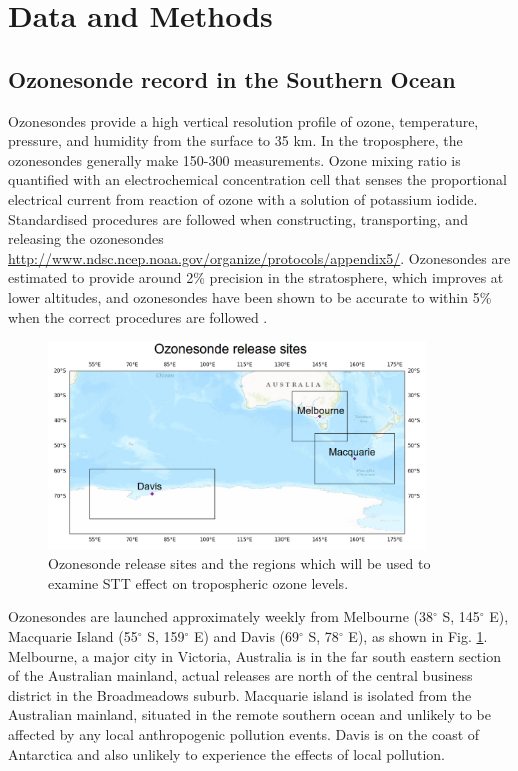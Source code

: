 \documentclass[acp, manuscript]{copernicus} %
\begin{document}
%
\section{Data and Methods}

  \subsection{Ozonesonde record in the Southern Ocean}
  \label{Section:ozonesondes}
    Ozonesondes provide a high vertical resolution profile of ozone, temperature, pressure, and humidity from the surface to 35 km.
    In the troposphere, the ozonesondes generally make 150-300 measurements.    
    Ozone mixing ratio is quantified with an electrochemical concentration cell that senses the proportional electrical current from reaction of ozone with a solution of potassium iodide.
    Standardised procedures are followed when constructing, transporting, and releasing the ozonesondes \url{http://www.ndsc.ncep.noaa.gov/organize/protocols/appendix5/}.
    Ozonesondes are estimated to provide around 2\% precision in the stratosphere, which improves at lower altitudes, and ozonesondes have been shown to be accurate to within 5\% when the correct procedures are followed \citep{Smit2007}.
    
    \begin{figure}
      \includegraphics[width=10cm]{figures/ComparisonRegions.png}
      \caption{Ozonesonde release sites and the regions which will be used to examine STT effect on tropospheric ozone levels.}
      \label{fig:ComparisonRegion}
    \end{figure}
    
    Ozonesondes are launched approximately weekly from Melbourne (38$^{\circ}$ S, 145$^{\circ}$ E), Macquarie Island (55$^{\circ}$ S, 159$^{\circ}$ E) and Davis (69$^{\circ}$ S, 78$^{\circ}$ E), as shown in Fig. \ref{fig:ComparisonRegion}. 
    Melbourne, a major city in Victoria, Australia is in the far south eastern section of the Australian mainland, actual releases are north of the central business district in the Broadmeadows suburb.
    Macquarie island is isolated from the Australian mainland, situated in the remote southern ocean and unlikely to be affected by any local anthropogenic pollution events.
    Davis is on the coast of Antarctica and also unlikely to experience the effects of local pollution.
    
\end{document}
